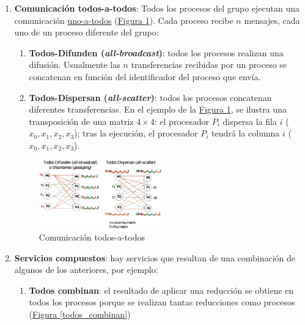 \documentclass[10pt,a4paper,spanish]{report}
\begin{document}
\begin{enumerate}[\color{azul}{\bf $\heartsuit$}]
\begin{figure}[!h]
    \end{figure}
    \item \textcolor[rgb]{0.2,0.4,0.8}{\textbf{Comunicación todos-a-todos}}: Todos los procesos del grupo ejecutan una comunicación \hyperref[uno_a_todos]{uno-a-todos} (\hyperref[comunicacion_todos_a_todos]{Figura \ref*{comunicacion_todos_a_todos}}). Cada proceso recibe $n$ mensajes, cada uno de un proceso diferente del grupo:
    \begin{enumerate}[$\longrightarrow$]
        \item \textcolor[rgb]{0.2,0.4,0.8}{\textbf{Todos-Difunden (\textit{all-broadcast})}}: todos los procesos realizan una difusión. Usualmente las $n$ transferencias recibidas por un proceso se concatenan en función del identificador del proceso que envía.
        \item \textcolor[rgb]{0.2,0.4,0.8}{\textbf{Todos-Dispersan (\textit{all-scatter})}}: todos los procesos concatenan diferentes transferencias. En el ejemplo de la \hyperref[comunicacion_todos_a_todos]{Figura \ref*{comunicacion_todos_a_todos}}, se ilustra una transposición de una matriz $4 \times 4$: el procesador $P_i$ dispersa la fila $i$ ($x_0, x_1, x_2, x_3$); tras la ejecución, el procesador $P_i$ tendrá la columna $i$ ($x_0, x_1, x_2, x_3$).
    \end{enumerate}
    \begin{figure}[!h]
        \centering
        \includegraphics[width=0.5\textwidth]{31}
        \caption{Comunicación todos-a-todos}
        \label{comunicacion_todos_a_todos}
    \end{figure}
    \item \textcolor[rgb]{0.2,0.4,0.8}{\textbf{Servicios compuestos}}: hay servicios que resultan de una combinación de algunos de los anteriores, por ejemplo:
    \begin{enumerate}[$\longrightarrow$]
        \item \textcolor[rgb]{0.2,0.4,0.8}{\textbf{Todos combinan}}: el resultado de aplicar una reducción se obtiene en todos los procesos porque se realizan tantas reducciones como procesos (\hyperref[todos_combinan]{Figura \ref*{todos_combinan}})

\end{enumerate}
\end{enumerate}
\end{document}
